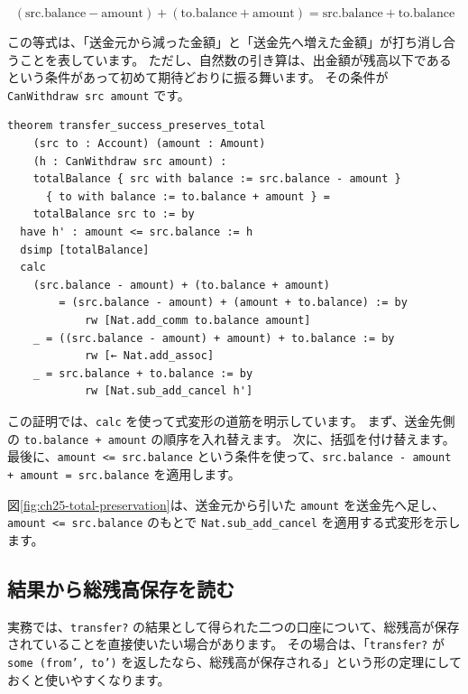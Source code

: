 \[
  (\mathrm{src.balance} - \mathrm{amount})
  + (\mathrm{to.balance} + \mathrm{amount})
  =
  \mathrm{src.balance} + \mathrm{to.balance}
\]

この等式は、「送金元から減った金額」と「送金先へ増えた金額」が打ち消し合うことを表しています。
ただし、自然数の引き算は、出金額が残高以下であるという条件があって初めて期待どおりに振る舞います。
その条件が \texttt{CanWithdraw src amount} です。

\begin{listing}[htbp]
\begin{verbatim}
theorem transfer_success_preserves_total
    (src to : Account) (amount : Amount)
    (h : CanWithdraw src amount) :
    totalBalance { src with balance := src.balance - amount }
      { to with balance := to.balance + amount } =
    totalBalance src to := by
  have h' : amount <= src.balance := h
  dsimp [totalBalance]
  calc
    (src.balance - amount) + (to.balance + amount)
        = (src.balance - amount) + (amount + to.balance) := by
            rw [Nat.add_comm to.balance amount]
    _ = ((src.balance - amount) + amount) + to.balance := by
            rw [← Nat.add_assoc]
    _ = src.balance + to.balance := by
            rw [Nat.sub_add_cancel h']
\end{verbatim}
\caption{\texttt{transfer\_success\_preserves\_total}}
\label{lst:ch25-transfer-total-proof}
\end{listing}

この証明では、\texttt{calc} を使って式変形の道筋を明示しています。
まず、送金先側の \texttt{to.balance + amount} の順序を入れ替えます。
次に、括弧を付け替えます。
最後に、\texttt{amount <= src.balance} という条件を使って、\texttt{src.balance - amount + amount = src.balance} を適用します。

図\ref{fig:ch25-total-preservation}は、送金元から引いた \texttt{amount} を送金先へ足し、\texttt{amount <= src.balance} のもとで \texttt{Nat.sub\_add\_cancel} を適用する式変形を示します。


\subsection{結果から総残高保存を読む}

実務では、\texttt{transfer?} の結果として得られた二つの口座について、総残高が保存されていることを直接使いたい場合があります。
その場合は、「\texttt{transfer?} が \texttt{some (from', to')} を返したなら、総残高が保存される」という形の定理にしておくと使いやすくなります。

